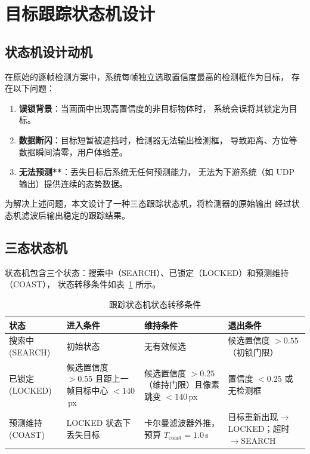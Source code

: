 \documentclass[12pt, a4paper]{ctexart}
\begin{document}
\section{目标跟踪状态机设计}
\label{sec:state_machine}

\subsection{状态机设计动机}

在原始的逐帧检测方案中，系统每帧独立选取置信度最高的检测框作为目标，
存在以下问题：

\begin{enumerate}
  \item \textbf{误锁背景}：当画面中出现高置信度的非目标物体时，
        系统会误将其锁定为目标。
  \item \textbf{数据断闪}：目标短暂被遮挡时，检测器无法输出检测框，
        导致距离、方位等数据瞬间清零，用户体验差。
  \item \textbf{无法预测**}：丢失目标后系统无任何预测能力，
        无法为下游系统（如 UDP 输出）提供连续的态势数据。
\end{enumerate}

为解决上述问题，本文设计了一种三态跟踪状态机，将检测器的原始输出
经过状态机滤波后输出稳定的跟踪结果。

\subsection{三态状态机}

状态机包含三个状态：搜索中（SEARCH）、已锁定（LOCKED）和预测维持（COAST），
状态转移条件如表~\ref{tab:state_machine} 所示。

\begin{table}[H]
\centering
\caption{跟踪状态机状态转移条件}
\label{tab:state_machine}
\begin{tabular}{p{2cm}p{3.5cm}p{4cm}p{4cm}}
\toprule
\textbf{状态} & \textbf{进入条件} & \textbf{维持条件} & \textbf{退出条件} \\
\midrule
搜索中 (SEARCH) & 初始状态 & 无有效候选 & 候选置信度 $> 0.55$（初锁门限） \\
已锁定 (LOCKED) & 候选置信度 $> 0.55$ 且距上一帧目标中心 $< 140$\,px & 候选置信度 $> 0.25$（维持门限）且像素跳变 $< 140$\,px & 置信度 $< 0.25$ 或无检测框 \\
预测维持 (COAST) & LOCKED 状态下丢失目标 & 卡尔曼滤波器外推，预算 $T_{\text{coast}} = 1.0$\,s & 目标重新出现$\rightarrow$LOCKED；超时$\rightarrow$SEARCH \\
\bottomrule
\end{tabular}
\end{table}
\end{document}
